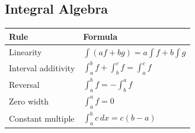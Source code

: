 \subsection*{Integral Algebra}

\begin{center}
\begin{tabular}{ll}
\toprule
Rule & Formula \\
\midrule
Linearity & \(\int (af+bg)=a\int f+b\int g\) \\
Interval additivity & \(\int_a^b f+\int_b^c f=\int_a^c f\) \\
Reversal & \(\int_a^b f=-\int_b^a f\) \\
Zero width & \(\int_a^a f=0\) \\
Constant multiple & \(\int_a^b c\,dx=c(b-a)\) \\
\bottomrule
\end{tabular}
\end{center}
